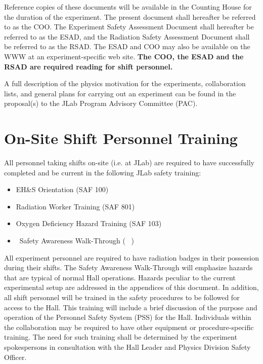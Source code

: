 \documentclass[10pt]{article}
\begin{document}
Reference copies of these documents will be available in the Counting
House for the duration of the experiment. The present document shall
hereafter be referred to as the COO. The Experiment Safety Assessment
Document shall hereafter be referred to as the ESAD, and the
Radiation Safety Assessment Document shall be referred to as the RSAD.
The ESAD and COO may also be available on the WWW at an experiment-specific
web site. {\bf The COO, the ESAD and the RSAD are required reading for
shift personnel.}

A full description of the physics motivation for the experiments, collaboration
lists, and general plans for carrying out an experiment can be found in the
proposal(s) to the JLab Program Advisory Committee (PAC).

\section{On-Site Shift Personnel Training}

All personnel taking shifts on-site (i.e. at JLab) are required to
have successfully completed and be current in the following JLab
safety training:

\begin{itemize}

\item EH\&S Orientation (SAF 100)

\item Radiation Worker Training (SAF 801)

\item Oxygen Deficiency Hazard Training (SAF 103)

\item \HALL\ Safety Awareness Walk-Through ( \AWARENESS\ )

\end{itemize}

 All experiment personnel are
required to have radiation badges in their possession during their shifts.
The Safety Awareness Walk-Through will
emphasize hazards that are typical of normal Hall operations.
Hazards  peculiar to the current experimental setup are addressed in the appendices
of this document.
In addition, all shift personnel will be trained in the safety procedures to be
followed for access to the Hall. This
training will include a brief discussion of the purpose and operation of the
Personnel Safety System (PSS) for the Hall.
Individuals within the collaboration may be required to have other equipment
or procedure-specific training. The need for such
training shall be determined by the experiment spokespersons in consultation
with the Hall Leader and Physics Division Safety Officer.
\end{document}
